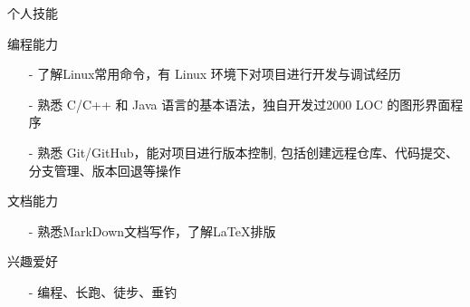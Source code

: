 \documentclass{resume} %
\begin{document}

\begin{rSection}{个人技能}
\begin{rSubsection}
{编程能力}{}{}{}
\item[]
\begin{itemize}
\setlength\itemsep{-0.5em}
\item[-] 了解Linux常用命令，有 Linux 环境下对项目进行开发与调试经历
\item[-] 熟悉 C/C++ 和 Java 语言的基本语法，独自开发过2000 LOC 的图形界面程序
\item[-] 熟悉 Git/GitHub，能对项目进行版本控制, 包括创建远程仓库、代码提交、分支管理、版本回退等操作
\end{itemize}
\end{rSubsection}

\begin{rSubsection}
{文档能力}{}{}{}
\item[]
\begin{itemize}
\setlength\itemsep{-0.5em}
\item[-] 熟悉MarkDown文档写作，了解\LaTeX{}排版
\end{itemize}
\end{rSubsection}

\begin{rSubsection}
{兴趣爱好}{}{}{}
\item[]
\begin{itemize}
\setlength\itemsep{-0.5em}
\item[-] 编程、长跑、徒步、垂钓
\end{itemize}
\end{rSubsection}

\end{rSection}
\end{document}

